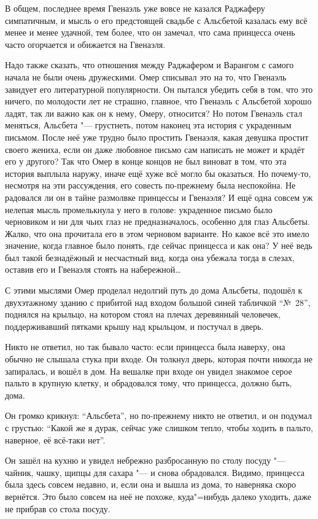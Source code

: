 В общем, последнее время Гвенаэль уже вовсе не казался Раджаферу симпатичным, и
мысль о его предстоящей свадьбе с Альсбетой казалась ему всё менее и менее
удачной, тем более, что он замечал, что сама принцесса очень часто огорчается и
обижается на Гвенаэля.

Надо также сказать, что отношения между Раджафером и Варангом с самого начала
не были очень дружескими.
Омер списывал это на то, что Гвенаэль завидует его литературной популярности.
Он пытался убедить себя в том, что это ничего, по молодости лет не страшно,
главное, что Гвенаэль с Альсбетой хорошо ладят, так ли важно как он к нему,
Омеру, относится?
Но потом Гвенаэль стал меняться, Альсбета "--- грустнеть, потом наконец эта
история с украденным письмом.
После неё уже трудно было простить Гвенаэля, какая девушка простит своего
жениха, если он даже любовное письмо сам написать не может и крадёт его у
другого?
Так что Омер в конце концов не был виноват в том, что эта история выплыла наружу,
иначе ещё хуже всё могло бы оказаться.
Но почему-то, несмотря на эти рассуждения, его совесть по-прежнему была
неспокойна.
Не радовался ли он в тайне размолвке принцессы и Гвенаэля?
И ещё одна совсем уж нелепая мысль промелькнула у него в голове: украденное
письмо было черновиком и ни для чьих глаз не предназначалось, особенно для глаз
Альсбеты.
Жалко, что она прочитала его в этом черновом варианте.
Но какое всё это имело значение, когда главное было понять, где сейчас принцесса
и как она?
У неё ведь был такой безнадёжный и несчастный вид, когда она убежала тогда в
слезах, оставив его и Гвенаэля стоять на набережной\ldots

С этими мыслями Омер проделал недолгий путь до дома Альсбеты, подошёл к
двухэтажному зданию с прибитой над входом большой синей табличкой \enquote{№~28},
поднялся на крыльцо, на котором стоял на плечах деревянный человечек,
поддерживавший пятками крышу над крыльцом, и постучал в дверь.

Никто не ответил, но так бывало часто: если принцесса была наверху, она обычно
не слышала стука при входе.
Он толкнул дверь, которая почти никогда не запиралась, и вошёл в дом.
На вешалке при входе он увидел знакомое серое пальто в крупную клетку, и
обрадовался тому, что принцесса, должно быть, дома.

Он громко крикнул: \enquote{Альсбета}, но по-прежнему никто не ответил, и он
подумал с грустью: \enquote{Какой же я дурак, сейчас уже слишком тепло, чтобы
ходить в пальто, наверное, её всё-таки нет}.

Он зашёл на кухню и увидел небрежно разбросанную по столу посуду "--- чайник,
чашку, щипцы для сахара "--- и снова обрадовался.
Видимо, принцесса была здесь совсем недавно, и, если она и вышла из дома, то
наверняка скоро вернётся.
Это было совсем на неё не похоже, куда"=нибудь далеко уходить, даже не прибрав
со стола посуду.

